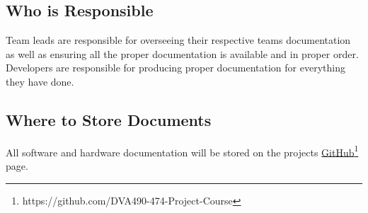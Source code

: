 \subsection{Who is Responsible}

Team leads are responsible for overseeing their respective teams documentation as well as ensuring all the proper documentation is available and in proper order. Developers are responsible for producing proper documentation for everything they have done.


\begin{comment}
Assign documentation duties to specific roles:

\begin{itemize}
\item \textbf{Hardware Team Leader:} Oversees and approves hardware-related documentation and assigns hardware-related documentation tasks.
\item \textbf{Software Team Leader:} Oversees and approves, and assigns software-related documentation tasks.
\item \textbf{Hardware Developer:} Creates and updates hardware-related documentation as assigned.
\item \textbf{Software Developer:} Creates and updates software-related documentation as assigned.
\end{itemize}
\end{comment}

\subsection{Where to Store Documents}

All software and hardware documentation will be stored on the projects \href{https://github.com/DVA490-474-Project-Course}{GitHub}\footnote{https://github.com/DVA490-474-Project-Course} page.



